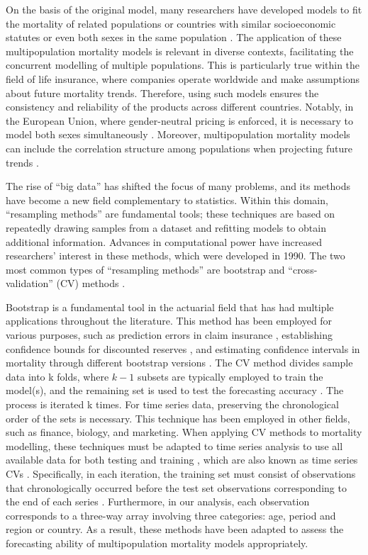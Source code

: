 On the basis of the original \citet{Lee1992} model, many researchers have developed models to fit the mortality of related populations or countries with similar socioeconomic statutes or even both sexes in the same population \citep{Brouhns2002, Debon2011, Dowd2011, Jarner2011, Li2011, Russolillo2011, Villegas2014, Danesi2015, Chen2018, Begin2023}. The application of these multipopulation mortality models is relevant in diverse contexts, facilitating the concurrent modelling of multiple populations. This is particularly true within the field of life insurance, where companies operate worldwide and make assumptions about future mortality trends. Therefore, using such models ensures the consistency and reliability of the products across different countries. Notably, in the European Union, where gender-neutral pricing is enforced, it is necessary to model both sexes simultaneously \citep{Ahmadi2014}. Moreover, multipopulation mortality models can include the correlation structure among populations when projecting future trends \citep{Antonio2017, Bozikas2020}.

The rise of ``big data'' has shifted the focus of many problems, and its methods have become a new field complementary to statistics. Within this domain, ``resampling methods'' are fundamental tools; these techniques are based on repeatedly drawing samples from a dataset and refitting models to obtain additional information. Advances in computational power have increased researchers' interest in these methods, which were developed in 1990. The two most common types of ``resampling methods'' are bootstrap and ``cross-validation'' (CV) methods \citep{Gareth2013}.

Bootstrap is a fundamental tool in the actuarial field that has had multiple applications throughout the literature. This method has been employed for various purposes, such as prediction errors in claim insurance \citep{England1999}, establishing confidence bounds for discounted reserves \citep{Hoedemakers2003}, and estimating confidence intervals in mortality through different bootstrap versions \citep{Brouhns2005, Koissi2006, Debon2008, Liu2010, Damato2012}. The CV method divides sample data into k folds, where $k-1$ subsets are typically employed to train the model(s), and the remaining set is used to test the forecasting accuracy \citep{Hastie2009}. The process is iterated k times. For time series data, preserving the chronological order of the sets is necessary. This technique has been employed in other fields, such as finance, biology, and marketing. When applying CV methods to mortality modelling, these techniques must be adapted to time series analysis to use all available data for both testing and training \citep{Tashman2000, Berg2012}, which are also known as time series CVs \citep{Hastie2009}. Specifically, in each iteration, the training set must consist of observations that chronologically occurred before the test set observations corresponding to the end of each series \citep{Hyndman2021}. Furthermore, in our analysis, each observation corresponds to a three-way array involving three categories: age, period and region or country. As a result, these methods have been adapted to assess the forecasting ability of multipopulation mortality models appropriately.

